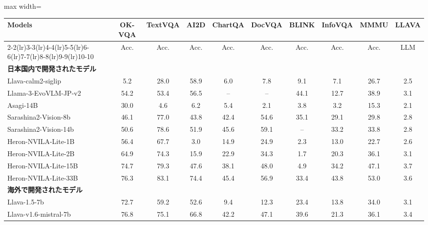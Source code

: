 \begingroup
\setlength{\tabcolsep}{2pt}
\renewcommand{\arraystretch}{0.9}
\begin{table*}[t]
\centering
\footnotesize
\caption{競争力のある視覚言語モデルの\methodName を用いた\textbf{英語タスク}での評価例．
``--''は評価データセットを学習に用いているためスコアが算出できないことを示す．\textbf{太字}は最も高い結果．\underline{下線}は二番目に高い結果を示している．}
\vspace{.2em}
\begin{adjustbox}{max width=\linewidth}
\begin{tabular}{lccccccccc}
\toprule
\multirow{2}{*}{\textbf{Models}} & \textbf{OK-VQA} & \textbf{TextVQA} & \textbf{AI2D} & \textbf{ChartQA} & \textbf{DocVQA} & \textbf{BLINK} & \textbf{InfoVQA} & \textbf{MMMU} & \textbf{LLAVA}\\
\cmidrule(lr){2-2}\cmidrule(lr){3-3}\cmidrule(lr){4-4}\cmidrule(lr){5-5}\cmidrule(lr){6-6}\cmidrule(lr){7-7}\cmidrule(lr){8-8}\cmidrule(lr){9-9}\cmidrule(lr){10-10}
 & Acc. & Acc. & Acc. & Acc. & Acc. & Acc. & Acc. & Acc. & LLM \\
\midrule
\multicolumn{10}{l}{\textbf{日本国内で開発されたモデル}} \\
\midrule
Llava-calm2-siglip & 5.2 & 28.0 & 58.9 & 6.0 & 7.8 & 9.1 & 7.1 & 26.7 & 2.5 \\
Llama-3-EvoVLM-JP-v2 & 54.2 & 53.4 & 56.5 & -- & -- & 44.1 & 12.7 & 38.9 & 3.1 \\
Asagi-14B & 30.0 & 4.6 & 6.2 & 5.4 & 2.1 & 3.8 & 3.2 & 15.3 & 2.1 \\
Sarashina2-Vision-8b & 46.1 & 77.0 & 43.8 & 42.4 & 54.6 & 35.1 & 29.1 & 29.8 & 2.8 \\
Sarashina2-Vision-14b & 50.6 & 78.6 & 51.9 & 45.6 & 59.1 & -- & 33.2 & 33.8 & 2.8 \\
Heron-NVILA-Lite-1B & 56.4 & 67.7 & 3.0 & 14.9 & 24.9 & 2.3 & 13.0 & 22.7 & 2.6 \\
Heron-NVILA-Lite-2B & 64.9 & 74.3 & 15.9 & 22.9 & 34.3 & 1.7 & 20.3 & 36.1 & 3.1 \\
Heron-NVILA-Lite-15B & 74.7 & 79.3 & 47.6 & 38.1 & 48.0 & 4.9 & 34.2 & 47.1 & 3.7 \\
Heron-NVILA-Lite-33B & 76.3 & 83.1 & 74.4 & 45.4 & 56.9 & 33.4 & 43.8 & 53.0 & 3.6 \\
\midrule
\multicolumn{10}{l}{\textbf{海外で開発されたモデル}} \\
\midrule
Llava-1.5-7b & 72.7 & 59.2 & 52.6 & 9.4 & 12.3 & 23.4 & 13.8 & 34.0 & 3.1 \\
Llava-v1.6-mistral-7b & 76.8 & 75.1 & 66.8 & 42.2 & 47.1 & 39.6 & 21.3 & 36.1 & 3.4 \\

\end{tabular}
\end{adjustbox}
\end{table*}
